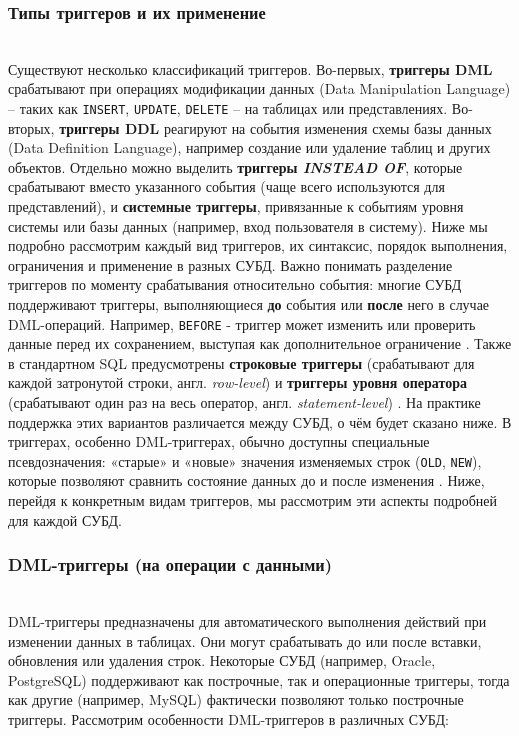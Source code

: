 \subsubsection{Типы триггеров и их применение} ~\\
 Существуют несколько классификаций триггеров. Во-первых, \textbf{триггеры DML} срабатывают при операциях модификации данных (Data Manipulation Language) – таких как \texttt{INSERT}, \texttt{UPDATE}, \texttt{DELETE} – на таблицах или представлениях. Во-вторых, \textbf{триггеры DDL} реагируют на события изменения схемы базы данных (Data Definition Language), например создание или удаление таблиц и других объектов. Отдельно можно выделить \textbf{триггеры \textit{INSTEAD OF}}, которые срабатывают вместо указанного события (чаще всего используются для представлений), и \textbf{системные триггеры}, привязанные к событиям уровня системы или базы данных (например, вход пользователя в систему). 
 Ниже мы подробно рассмотрим каждый вид триггеров, их синтаксис, порядок выполнения, ограничения и применение в разных СУБД. Важно понимать разделение триггеров по моменту срабатывания относительно события: многие СУБД поддерживают триггеры, выполняющиеся \textbf{до} события или \textbf{после} него в случае DML-операций. Например, \texttt{BEFORE} - триггер может изменить или проверить данные перед их сохранением, выступая как дополнительное ограничение \autocite{Silberschatz}. Также в стандартном SQL предусмотрены \textbf{строковые триггеры} (срабатывают для каждой затронутой строки, англ. \textit{row-level}) и \textbf{триггеры уровня оператора} (срабатывают один раз на весь оператор, англ. \textit{statement-level}) \autocite{Silberschatz}. 
 На практике поддержка этих вариантов различается между СУБД, о чём будет сказано ниже. В триггерах, особенно DML-триггерах, обычно доступны специальные псевдозначения: «старые» и «новые» значения изменяемых строк (\texttt{OLD}, \texttt{NEW}), которые позволяют сравнить состояние данных до и после изменения \autocite{Silberschatz}. Ниже, перейдя к конкретным видам триггеров, мы рассмотрим эти аспекты подробней для каждой СУБД.

\subsubsection{DML-триггеры (на операции с данными)} ~\\
 DML-триггеры предназначены для автоматического выполнения действий при изменении данных в таблицах. Они могут срабатывать до или после вставки, обновления или удаления строк. Некоторые СУБД (например, Oracle, PostgreSQL) поддерживают как построчные, так и операционные триггеры, тогда как другие (например, MySQL) фактически позволяют только построчные триггеры. Рассмотрим особенности DML-триггеров в различных СУБД:

